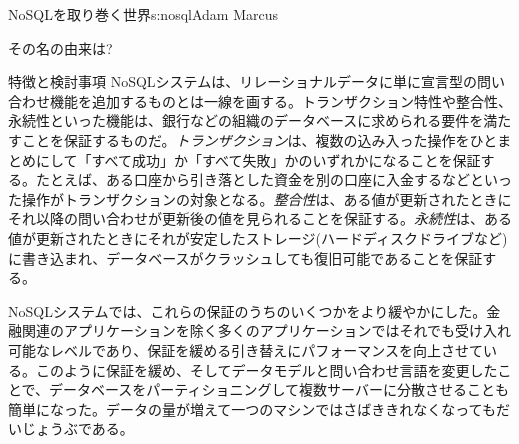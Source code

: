 \begin{aosachapter}{NoSQLを取り巻く世界}{s:nosql}{Adam Marcus}
\begin{aosasect1}{その名の由来は?}
\begin{aosasect2}{特徴と検討事項}
NoSQLシステムは、リレーショナルデータに単に宣言型の問い合わせ機能を追加するものとは一線を画する。トランザクション特性や整合性、永続性といった機能は、銀行などの組織のデータベースに求められる要件を満たすことを保証するものだ。\emph{トランザクション}は、複数の込み入った操作をひとまとめにして「すべて成功」か「すべて失敗」かのいずれかになることを保証する。たとえば、ある口座から引き落とした資金を別の口座に入金するなどといった操作がトランザクションの対象となる。\emph{整合性}は、ある値が更新されたときにそれ以降の問い合わせが更新後の値を見られることを保証する。\emph{永続性}は、ある値が更新されたときにそれが安定したストレージ(ハードディスクドライブなど)に書き込まれ、データベースがクラッシュしても復旧可能であることを保証する。

NoSQLシステムでは、これらの保証のうちのいくつかをより緩やかにした。金融関連のアプリケーションを除く多くのアプリケーションではそれでも受け入れ可能なレベルであり、保証を緩める引き替えにパフォーマンスを向上させている。このように保証を緩め、そしてデータモデルと問い合わせ言語を変更したことで、データベースをパーティショニングして複数サーバーに分散させることも簡単になった。データの量が増えて一つのマシンではさばききれなくなってもだいじょうぶである。


\end{aosasect2}
\end{aosasect1}
\end{aosachapter}
